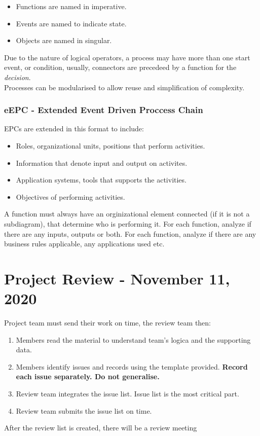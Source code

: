 \documentclass[11pt,a4paper,twocolumn]{book}
\begin{document}
\begin{itemize}
\item Functions are named in imperative.
\item Events are named to indicate state.
\item Objects are named in singular.
\end{itemize}

Due to the nature of logical operators, a process may have more than one start event, or condition, usually, connectors are precedeed by a function for the \textit{decision}.\\

Processes can be modularised to allow reuse and simplification of complexity.

\subsection{eEPC - Extended Event Driven Proccess Chain}

EPCs are extended in this format to include:

\begin{itemize}
\item Roles, organizational units, positions that perform activities.
\item Information that denote input and output on activites.
\item Application systems, tools that supports the activities.
\item Objectives of performing activities.
\end{itemize}

A function must always have an orginizational element connected (if it is not a subdiagram), that determine who is performing it. For each function, analyze if there are any inputs, outputs or both. For each function, analyze if there are any business rules applicable, any applications used etc.

\chapter{Project Review - November 11, 2020}

Project team must send their work on time, the review team then:

\begin{enumerate}
\item Members read the material to understand team's logica and the supporting data.
\item Members identify issues and records using the template provided. \textbf{Record each issue separately. Do not generalise.}
\item Review team integrates the issue list. Issue list is the most critical part.
\item Review team submits the issue list on time.
\end{enumerate}

After the review list is created, there will be a review meeting
\end{document}
